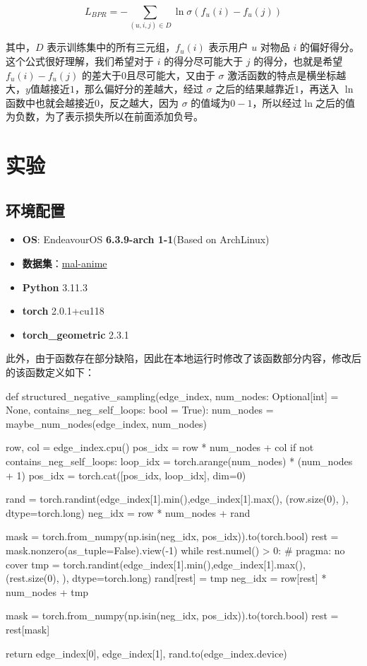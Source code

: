 \documentclass[hyperref,a4paper,UTF8]{ctexart}
\begin{document}
$$L_{BPR} = -\sum_{(u, i, j) \in D} \ln \sigma(f_u(i) - f_u(j))$$

其中，$D$ 表示训练集中的所有三元组，$f_u(i)$ 表示用户 $u$ 对物品 $i$ 的偏好得分。这个公式很好理解，我们希望对于 $i$ 的得分尽可能大于 $j$ 的得分，也就是希望 $f_u(i)-f_u(j)$ 的差大于$0$且尽可能大，又由于 $\sigma$ 激活函数的特点是横坐标越大，$y$值越接近$1$，那么偏好分的差越大，经过 $\sigma$ 之后的结果越靠近$1$，再送入 $\ln$ 函数中也就会越接近$0$，反之越大，因为 $\sigma$ 的值域为$0-1$，所以经过$\ln$之后的值为负数，为了表示损失所以在前面添加负号。

\section{实验}
\subsection{环境配置}
\begin{itemize}
    \item \textbf{OS}: EndeavourOS \textbf{6.3.9-arch 1-1}(Based on ArchLinux)
    \item \textbf{数据集}：\hyperlink{https://www.kaggle.com/datasets/shafiwalsher/myanimelist-dataset-2023-top-15000}{mal-anime}
    \item \textbf{Python} 3.11.3
    \item \textbf{torch} 2.0.1+cu118
    \item \textbf{torch\_geometric} 2.3.1
\end{itemize}

此外，由于函数存在部分缺陷，因此在本地运行时修改了该函数部分内容，修改后的该函数定义如下：

\begin{python}
    def structured_negative_sampling(edge_index, num_nodes: Optional[int] = None, contains_neg_self_loops: bool = True):
        num_nodes = maybe_num_nodes(edge_index, num_nodes)
    
        row, col = edge_index.cpu()
        pos_idx = row * num_nodes + col
        if not contains_neg_self_loops:
        loop_idx = torch.arange(num_nodes) * (num_nodes + 1)
        pos_idx = torch.cat([pos_idx, loop_idx], dim=0)
    
        rand = torch.randint(edge_index[1].min(),edge_index[1].max(), (row.size(0), ), dtype=torch.long)
        neg_idx = row * num_nodes + rand
    
        mask = torch.from_numpy(np.isin(neg_idx, pos_idx)).to(torch.bool)
        rest = mask.nonzero(as_tuple=False).view(-1)
        while rest.numel() > 0:  # pragma: no cover
        tmp = torch.randint(edge_index[1].min(),edge_index[1].max(), (rest.size(0), ), dtype=torch.long)
        rand[rest] = tmp
        neg_idx = row[rest] * num_nodes + tmp
    
        mask = torch.from_numpy(np.isin(neg_idx, pos_idx)).to(torch.bool)
        rest = rest[mask]
    
        return edge_index[0], edge_index[1], rand.to(edge_index.device)

\end{python}
\end{document}
